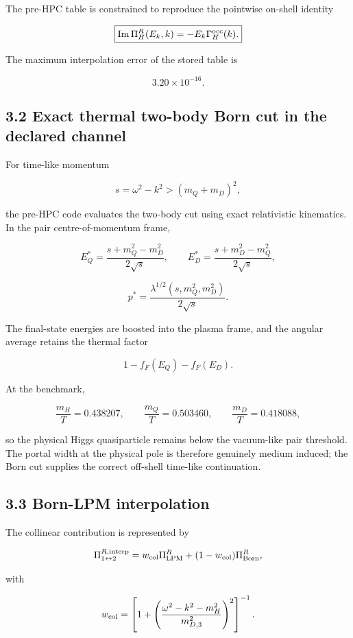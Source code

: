 \documentclass[
  10pt,
]{article}
\begin{document}
The pre-HPC table is constrained to reproduce the pointwise on-shell
identity

\[
\boxed{
\operatorname{Im}\Pi_H^R(E_k,k)
=
-E_k\Gamma_H^{\rm occ}(k).
}
\]

The maximum interpolation error of the stored table is

\[
\boxed{3.20\times10^{-16}.}
\]

\subsection{3.2 Exact thermal two-body Born cut in the declared
channel}\label{exact-thermal-two-body-born-cut-in-the-declared-channel}

For time-like momentum

\[
s=\omega^2-k^2>(m_Q+m_D)^2,
\]

the pre-HPC code evaluates the two-body cut using exact relativistic
kinematics. In the pair centre-of-momentum frame,

\[
E_Q^*=\frac{s+m_Q^2-m_D^2}{2\sqrt{s}},
\qquad
E_D^*=\frac{s+m_D^2-m_Q^2}{2\sqrt{s}},
\]

\[
p^*=\frac{\lambda^{1/2}(s,m_Q^2,m_D^2)}{2\sqrt{s}}.
\]

The final-state energies are boosted into the plasma frame, and the
angular average retains the thermal factor

\[
1-f_F(E_Q)-f_F(E_D).
\]

At the benchmark,

\[
\frac{m_H}{T}=0.438207,
\qquad
\frac{m_Q}{T}=0.503460,
\qquad
\frac{m_D}{T}=0.418088,
\]

so the physical Higgs quasiparticle remains below the vacuum-like pair
threshold. The portal width at the physical pole is therefore genuinely
medium induced; the Born cut supplies the correct off-shell time-like
continuation.

\subsection{3.3 Born-LPM interpolation}\label{born-lpm-interpolation}

The collinear contribution is represented by

\[
\Pi_{1\leftrightarrow2}^{R,\rm interp}
=
w_{\rm col}\Pi_{\rm LPM}^R
+
(1-w_{\rm col})\Pi_{\rm Born}^R,
\]

with

\[
w_{\rm col}
=
\left[
1+
\left(
\frac{\omega^2-k^2-m_H^2}{m_{D,3}^2}
\right)^2
\right]^{-1}.
\]
\end{document}
